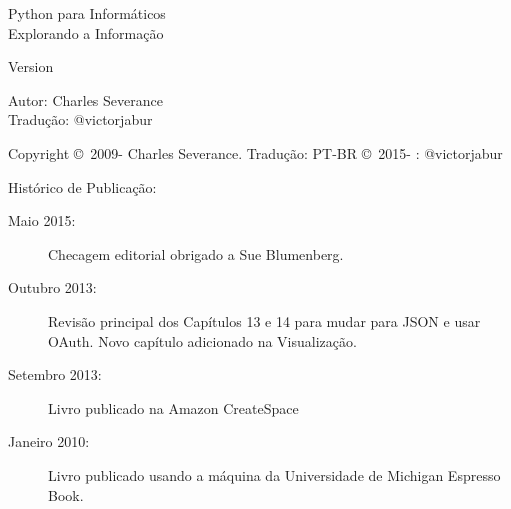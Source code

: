 



\newtheorem{ex}{Exercise}[chapter]

\begin{latexonly}

\renewcommand{\blankpage}{\thispagestyle{empty} \quad \newpage}

\thispagestyle{empty}

\begin{flushright}
\vspace*{2.0in}

\begin{spacing}{3}
{\huge Python para Informáticos}\\
{\Large Explorando a Informação}
\end{spacing}

\vspace{0.25in}

Version \theversion

\vspace{0.5in}


{\Large
Autor: Charles Severance\\
Tradução: @victorjabur
}

\vfill

\end{flushright}

\pagebreak
\thispagestyle{empty}

{\small
Copyright \copyright ~2009- Charles Severance.
Tradução: PT-BR \copyright ~2015- : @victorjabur

Histórico de Publicação:

\begin{description}

\item[Maio 2015:] Checagem editorial obrigado a Sue Blumenberg.

\item[Outubro 2013:] Revisão principal dos Capítulos 13 e 14
para mudar para JSON e usar OAuth.
Novo capítulo adicionado na Visualização.

\item[Setembro 2013:] Livro publicado na Amazon CreateSpace

\item[Janeiro 2010:] Livro publicado usando a máquina da Universidade de 
Michigan Espresso Book.


\end{description}}
\end{latexonly}
